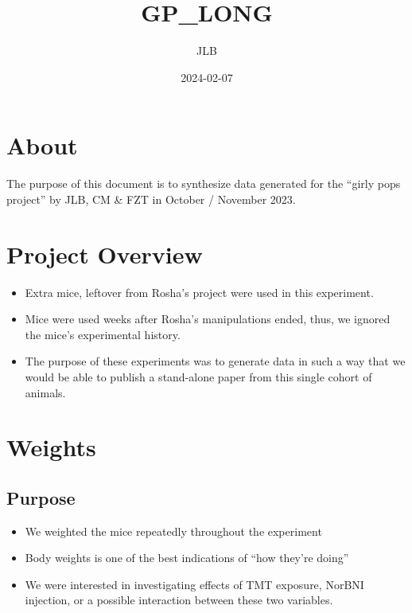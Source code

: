 \documentclass[
]{book}
\title{GP\_LONG}
\author{JLB}
\date{2024-02-07}
\providecommand{\tightlist}{%
  \setlength{\itemsep}{0pt}\setlength{\parskip}{0pt}}
\begin{document}
\maketitle

{
\setcounter{tocdepth}{1}
\tableofcontents
}
\hypertarget{about}{%
\chapter*{About}\label{about}}

The purpose of this document is to synthesize data generated for the ``girly pops project'' by JLB, CM \& FZT in October / November 2023.

\hypertarget{project-overview}{%
\chapter*{Project Overview}\label{project-overview}}

\begin{itemize}
\item
  Extra mice, leftover from Rosha's project were used in this experiment.
\item
  Mice were used weeks after Rosha's manipulations ended, thus, we ignored the mice's experimental history.
\item
  The purpose of these experiments was to generate data in such a way that we would be able to publish a stand-alone paper from this single cohort of animals.
\end{itemize}

\hypertarget{weights}{%
\chapter{Weights}\label{weights}}

\hypertarget{purpose}{%
\section{Purpose}\label{purpose}}

\begin{itemize}
\tightlist
\item
  We weighted the mice repeatedly throughout the experiment
\item
  Body weights is one of the best indications of ``how they're doing''
\item
  We were interested in investigating effects of TMT exposure, NorBNI injection, or a possible interaction between these two variables.
\end{itemize}
\end{document}
